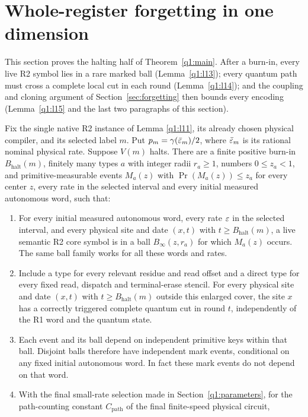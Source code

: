 \section{Whole-register forgetting in one dimension}\label{q1:forgetting}
This section proves the halting half of Theorem~\ref{q1:main}. After a burn-in, every live R2 symbol lies in a rare marked ball (Lemma~\ref{q1:l13}); every quantum path must cross a complete local cut in each round (Lemma~\ref{q1:l14}); and the coupling and cloning argument of Section~\ref{sec:forgetting} then bounds every encoding (Lemma~\ref{q1:l15} and the last two paragraphs of this section).

\begin{lemma}\label{q1:l13}

Fix the single native R2 instance of Lemma \ref{q1:l11}, its already chosen physical compiler, and its selected label \(m\). Put \(p_{m}=\gamma(\bar{\varepsilon}_{m})/2\), where \(\bar{\varepsilon}_{m}\) is its rational nominal physical rate. Suppose \(V(m)\) halts. There are a finite positive burn-in \(B_{\mathrm{halt}}(m)\), finitely many types \(a\) with integer radii \(r_{a}\ge 1\), numbers \(0\le z_{a}<1\), and primitive-measurable events \(M_{a}(z)\) with \(\Pr(M_{a}(z))\le z_{a}\) for every center \(z\), every rate in the selected interval and every initial measured autonomous word, such that:

\begin{enumerate}[label=\arabic*.]
\item For every initial measured autonomous word, every rate \(\varepsilon\) in the selected interval, and every physical site and date \((x,t)\) with \(t\ge B_{\mathrm{halt}}(m)\), a live semantic R2 core symbol is in a ball \(B_{\infty}(z,r_{a})\) for which \(M_{a}(z)\) occurs. The same ball family works for all these words and rates.
\item Include a type for every relevant residue and read offset and a direct type for every fixed read, dispatch and terminal-erase stencil. For every physical site and date \((x,t)\) with \(t\ge B_{\mathrm{halt}}(m)\) outside this enlarged cover, the site \(x\) has a correctly triggered complete quantum cut in round \(t\), independently of the R1 word and the quantum state.
\item Each event and its ball depend on independent primitive keys within that ball. Disjoint balls therefore have independent mark events, conditional on any fixed initial autonomous word. In fact these mark events do not depend on that word.
\item With the final small-rate selection made in Section~\ref{q1:parameters}, for the path-counting constant \(C_{\mathrm{path}}\) of the final finite-speed physical circuit,
\end{enumerate}


\end{lemma}
